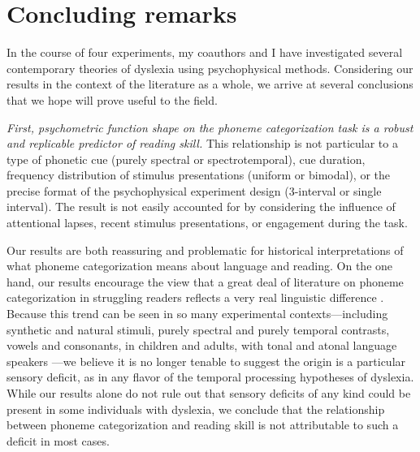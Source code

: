\documentclass[../uwthesis.tex]{subfiles}
\begin{document}
\chapter {Concluding remarks}
In the course of four experiments, my coauthors and I have investigated several contemporary theories of dyslexia using psychophysical methods. Considering our results in the context of the literature as a whole, we arrive at several conclusions that we hope will prove useful to the field. 

\emph{First, psychometric function shape on the phoneme categorization task is a robust and replicable predictor of reading skill.} This relationship is not particular to a type of phonetic cue (purely spectral or spectrotemporal), cue duration, frequency distribution of stimulus presentations (uniform or bimodal), or the precise format of the psychophysical experiment design (3-interval or single interval). The result is not easily accounted for by considering the influence of attentional lapses, recent stimulus presentations, or engagement during the task. 

Our results are both reassuring and problematic for historical interpretations of what phoneme categorization means about language and reading. On the one hand, our results encourage the view that a great deal of literature on phoneme categorization in struggling readers reflects a very real linguistic difference \citep{Mody1997,Serniclaes2004,Noordenbos2015}. Because this trend can be seen in so many experimental contexts---including synthetic and natural stimuli, purely spectral and purely temporal contrasts, vowels and consonants, in children and adults, with tonal and atonal language speakers \citep{Noordenbos2015}---we believe it is no longer tenable to suggest the origin is a particular sensory deficit, as in any flavor of the temporal processing hypotheses of dyslexia. While our results alone do not rule out that sensory deficits of any kind could be present in some individuals with dyslexia, we conclude that the relationship between phoneme categorization and reading skill is not attributable to such a deficit in most cases. 
\end{document}
